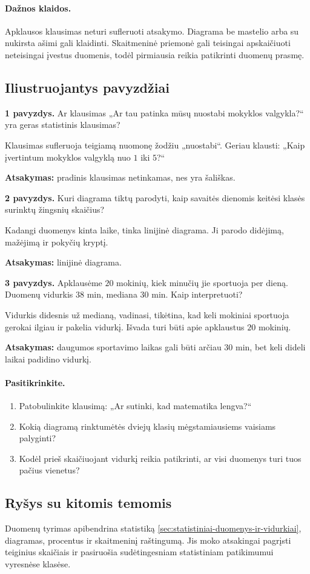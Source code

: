 \paragraph{Dažnos klaidos.}
Apklausos klausimas neturi sufleruoti atsakymo. Diagrama be mastelio arba su nukirsta ašimi gali klaidinti. Skaitmeninė priemonė gali teisingai apskaičiuoti neteisingai įvestus duomenis, todėl pirmiausia reikia patikrinti duomenų prasmę.

\subsection{Iliustruojantys pavyzdžiai}
\textbf{1 pavyzdys.} Ar klausimas „Ar tau patinka mūsų nuostabi mokyklos valgykla?“ yra geras statistinis klausimas?

Klausimas sufleruoja teigiamą nuomonę žodžiu „nuostabi“. Geriau klausti: „Kaip įvertintum mokyklos valgyklą nuo \(1\) iki \(5\)?“

\textbf{Atsakymas:} pradinis klausimas netinkamas, nes yra šališkas.

\textbf{2 pavyzdys.} Kuri diagrama tiktų parodyti, kaip savaitės dienomis keitėsi klasės surinktų žingsnių skaičius?

Kadangi duomenys kinta laike, tinka linijinė diagrama. Ji parodo didėjimą, mažėjimą ir pokyčių kryptį.

\textbf{Atsakymas:} linijinė diagrama.

\textbf{3 pavyzdys.} Apklausėme \(20\) mokinių, kiek minučių jie sportuoja per dieną. Duomenų vidurkis \(38\) min, mediana \(30\) min. Kaip interpretuoti?

Vidurkis didesnis už medianą, vadinasi, tikėtina, kad keli mokiniai sportuoja gerokai ilgiau ir pakelia vidurkį. Išvada turi būti apie apklaustus \(20\) mokinių.

\textbf{Atsakymas:} daugumos sportavimo laikas gali būti arčiau \(30\) min, bet keli dideli laikai padidino vidurkį.

\paragraph{Pasitikrinkite.}
\begin{enumerate}[label=\arabic*.]
\item Patobulinkite klausimą: „Ar sutinki, kad matematika lengva?“
\item Kokią diagramą rinktumėtės dviejų klasių mėgstamiausiems vaisiams palyginti?
\item Kodėl prieš skaičiuojant vidurkį reikia patikrinti, ar visi duomenys turi tuos pačius vienetus?
\end{enumerate}

\subsection{Ryšys su kitomis temomis}
Duomenų tyrimas apibendrina statistiką \ref{sec:statistiniai-duomenys-ir-vidurkiai}, diagramas, procentus ir skaitmeninį raštingumą. Jis moko atsakingai pagrįsti teiginius skaičiais ir pasiruošia sudėtingesniam statistiniam patikimumui vyresnėse klasėse.
